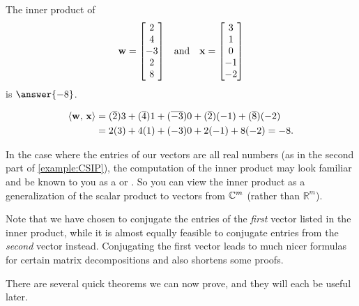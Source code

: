 \documentclass{ximera}
\begin{document}
\begin{example}
  The inner product of
  \begin{align*}
    \mathbf{w}=\begin{bmatrix}2\\4\\-3\\2\\8\end{bmatrix}&&\text{and}&&
                                                      \mathbf{x}=\begin{bmatrix}3\\1\\0\\-1\\-2\end{bmatrix}
  \end{align*}
  is $\answer{-8}$.
  
  \begin{hint}
    \begin{align*}
      \left\langle\mathbf{w},\,\mathbf{x}\right\rangle&=
                                         (\overline{2})3+(\overline{4})1+(\overline{-3})0+(\overline{2})(-1)+(\overline{8})(-2)\\
                                       &=2(3)+4(1)+(-3)0+2(-1)+8(-2)=-8.
    \end{align*}
  \end{hint}
\end{example}

In the case where the entries of our vectors are all real numbers (as
in the second part of \ref{example:CSIP}), the computation of the
inner product may look familiar and be known to you as a  or .  So you can view the inner product
as a generalization of the scalar product to vectors from
$\mathbb{C}^{m}$ (rather than ${\mathbb R}^m$).

\begin{warning}
  Note that we have chosen to conjugate the entries of the
  \textit{first} vector listed in the inner product, while it is
  almost equally feasible to conjugate entries from the
  \textit{second} vector instead.  Conjugating the first vector leads
  to much nicer formulas for certain matrix decompositions and also
  shortens some proofs.
\end{warning}

There are several quick theorems we can now prove, and they will each be useful later.
\end{document}
